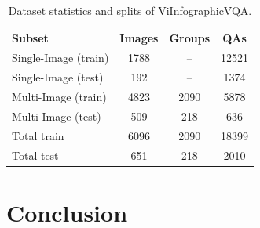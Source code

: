 \documentclass[conference]{IEEEtran}
\begin{document}
\begin{table}[t]
    \centering
    \caption{Dataset statistics and splits of ViInfographicVQA.}
    \label{tab:dataset_stats}

    \begin{tabular}{lccc}
        \toprule
        \textbf{Subset} & \textbf{Images} & \textbf{Groups} & \textbf{QAs} \\
        \midrule
        Single-Image (train) & 1788 & -- & 12521 \\
        Single-Image (test)  & 192  & -- & 1374  \\
        Multi-Image (train)  & 4823 & 2090 & 5878 \\
        Multi-Image (test)   & 509  & 218  & 636  \\
        \midrule
        Total train & 6096 & 2090 & 18399 \\
        Total test  & 651  & 218  & 2010  \\
        \bottomrule
    \end{tabular}
\end{table}

\section{\textbf{Conclusion}}



\end{document}
